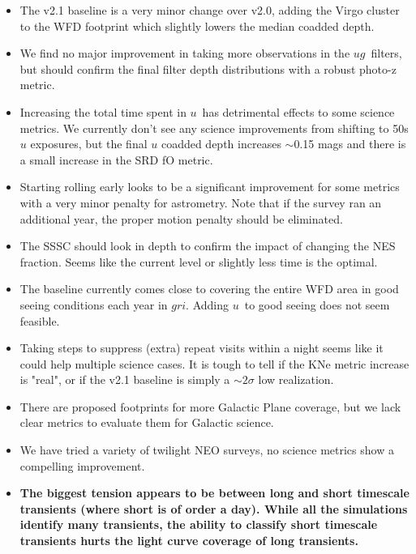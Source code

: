 \begin{itemize}
   \item{The v2.1 baseline is a very minor change over v2.0, adding the Virgo cluster to the WFD footprint which slightly lowers the median coadded depth.}
   \item{We find no major improvement in taking more observations in the $ug$\ filters, but should confirm the final filter depth distributions with a robust photo-z metric.}
   \item{Increasing the total time spent in $u$\ has detrimental effects to some science metrics. We currently don't see any science improvements from shifting to 50s $u$ exposures, but the final $u$ coadded depth increases $\sim$0.15 mags and there is a small increase in the SRD fO metric.}
   \item{Starting rolling early looks to be a significant improvement for some metrics with a very minor penalty for astrometry. Note that if the survey ran an additional year, the proper motion penalty should be eliminated.}
   \item{The SSSC should look in depth to confirm the impact of changing the NES fraction. Seems like the current level or slightly less time is the optimal.}
   \item{The baseline currently comes close to covering the entire WFD area in good seeing conditions each year in $gri$. Adding $u$\ to good seeing does not seem feasible.}
   \item{Taking steps to suppress (extra) repeat visits within a night seems like it could help multiple science cases. It is tough to tell if the KNe metric increase is "real", or if the v2.1 baseline is simply a $\sim 2\sigma$ low realization.}
   \item{There are proposed footprints for more Galactic Plane coverage, but we lack clear metrics to evaluate them for Galactic science.}
   \item{We have tried a variety of twilight NEO surveys, no science metrics show a compelling improvement.}
   \item{{\bf The biggest tension appears to be between long and short timescale transients (where short is of order a day). While all the simulations identify many transients, the ability to classify short timescale transients hurts the light curve coverage of long transients. }}


\end{itemize}

